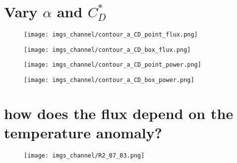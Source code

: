 \documentclass[12pt,a4paper]{article}
\begin{document}
\section{Vary $\alpha$ and $C_D^*$}
\begin{figure}[h!]
\centering
\texttt{[image: imgs\_channel/contour\_a\_CD\_point\_flux.png]}
\end{figure}

\begin{figure}[h!]
\centering
\texttt{[image: imgs\_channel/contour\_a\_CD\_box\_flux.png]}
\end{figure}

\begin{figure}[h!]
\centering
\texttt{[image: imgs\_channel/contour\_a\_CD\_point\_power.png]}
\end{figure}

\begin{figure}[h!]
\centering
\texttt{[image: imgs\_channel/contour\_a\_CD\_box\_power.png]}
\end{figure}

\section{how does the flux depend on the temperature anomaly?}
\begin{figure}[h!]
\centering
\texttt{[image: imgs\_channel/R2\_07\_03.png]}
\end{figure}
\end{document}
